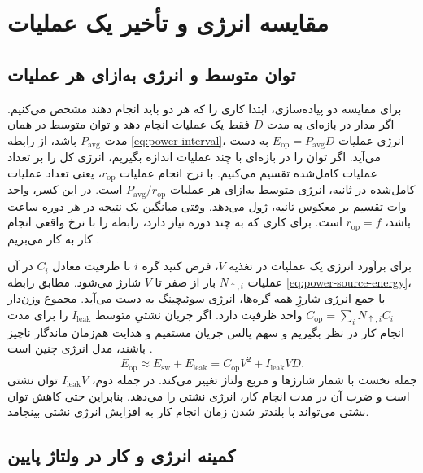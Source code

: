 \section{مقایسه انرژی و تأخیر یک عملیات}
\label{sec:power-energy-delay}

\subsection{توان متوسط و انرژی به‌ازای هر عملیات}
\label{sec:power-energy-per-operation}

برای مقایسه دو پیاده‌سازی، ابتدا کاری را که هر دو باید انجام دهند
مشخص می‌کنیم. اگر مدار در بازه‌ای به مدت \(D\) فقط یک عملیات
انجام دهد و توان متوسط در همان مدت \(P_{\mathrm{avg}}\) باشد، از رابطه
\eqref{eq:power-interval}، انرژی عملیات \(E_{\mathrm{op}}=P_{\mathrm{avg}}D\)
به دست می‌آید. اگر توان را در بازه‌ای با چند عملیات اندازه بگیریم،
انرژی کل را بر تعداد عملیات کامل‌شده تقسیم می‌کنیم. با نرخ انجام
عملیات \(r_{\mathrm{op}}\)، یعنی تعداد عملیات کامل‌شده در ثانیه،
انرژی متوسط به‌ازای هر عملیات \(P_{\mathrm{avg}}/r_{\mathrm{op}}\)
است. در این کسر، واحد وات تقسیم بر معکوس ثانیه، ژول می‌دهد.
وقتی میانگین یک نتیجه در هر دوره ساعت باشد،
\(r_{\mathrm{op}}=f\) است. برای کاری که به چند دوره نیاز دارد،
رابطه را با نرخ واقعی انجام کار به کار می‌بریم
\cite[بخش‌های  و ، صفحات
۲۰۰ و ۲۰۶]{weste}.

برای برآورد انرژی یک عملیات در تغذیه \(V\)، فرض کنید گره \(i\)
با ظرفیت معادل \(C_i\) در آن عملیات \(N_{\uparrow,i}\) بار از صفر
تا \(V\) شارژ می‌شود. مطابق رابطه \eqref{eq:power-source-energy}،
با جمع انرژی شارژِ همه گره‌ها، انرژی سوئیچینگ به دست می‌آید. مجموع
وزن‌دار \(C_{\mathrm{op}}=\sum_i N_{\uparrow,i} C_i\) واحد ظرفیت
دارد. اگر جریان نشتیِ متوسط \(I_{\mathrm{leak}}\) را برای مدت
انجام کار در نظر بگیریم و سهم پالس جریان مستقیم و هدایت هم‌زمان
ماندگار ناچیز باشند، مدل انرژی چنین است
\cite[رابطه ، صفحه ۲۰۲]{weste}.
\begin{equation}
  E_{\mathrm{op}}\approx E_{\mathrm{sw}}+E_{\mathrm{leak}}
    =C_{\mathrm{op}}V^2+I_{\mathrm{leak}}VD.
  \label{eq:power-operation-energy}
\end{equation}
جمله نخست با شمار شارژها و مربع ولتاژ تغییر می‌کند. در جمله دوم،
\(I_{\mathrm{leak}}V\) توان نشتی است و ضرب آن در مدت انجام کار،
انرژی نشتی را می‌دهد. بنابراین حتی کاهش توان نشتی می‌تواند با
بلندتر شدن زمان انجام کار به افزایش انرژی نشتی بینجامد.

\subsection{کمینه انرژی و کار در ولتاژ پایین}
\label{sec:power-minimum-energy}


